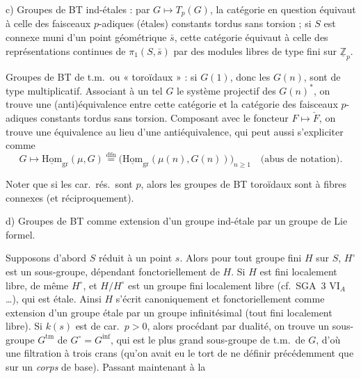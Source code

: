 \documentclass[11pt,a4paper]{article}
\begin{document}
c) Groupes de BT ind-étales : par $G \mapsto T_p(G)$, \struck{\ill{}} la catégorie en question équivaut à celle des faisceaux $p$-adiques (étales) constants tordus \struck{\ill{}} sans torsion ; si $S$ est connexe muni d'un point géométrique $\bar s$, cette catégorie équivaut à celle des représentations continues de $\pi_1(S, \bar s)$ par des modules libres de type fini sur $\underline{\mathbb{Z}}_p$.

Groupes de BT de t.m.\ ou « toroïdaux » : si $G(1)$, donc les $G(n)$, sont de type multiplicatif. Associant à un tel $G$ le système projectif des $G(n)^{*}$, on trouve \struck{\ill{}} une (anti)équivalence entre cette catégorie et la catégorie des faisceaux $p$-adiques constants tordus sans torsion. Composant avec le foncteur $F \mapsto \check F$, on trouve une équivalence au lieu d'une antiéquivalence, qui peut aussi s'expliciter comme 
\[
G \longmapsto \underline{\mathrm{Hom}}_{\mathrm{gr}}(\mu, G) \overset{\mathrm{dfn}}{=} \bigl(\underline{\mathrm{Hom}}_{\mathrm{gr}}(\mu(n), G(n))\bigr)_{n \geq 1} \quad \text{(abus de notation)} .
\]

Noter que si les car.\ rés.\ sont $p$, alors les groupes de BT toroïdaux sont  à fibres connexes (et réciproquement).

d) Groupes de BT comme extension d'un groupe ind-étale par un groupe de Lie formel.

Supposons d'abord $S$  réduit à un point $s$. Alors pour tout groupe fini $H$ sur $S$, $H^{\circ}$ est un sous-groupe, dépendant fonctoriellement de $H$. Si $H$ est fini localement libre, de même $H^{\circ}$, et $H/H^{\circ}$ est un groupe fini localement libre (cf.\ SGA~3 VI$_A$ \ldots), qui est étale. Ainsi $H$ s'écrit canoniquement et fonctoriellement comme extension d'un groupe étale par un groupe infinitésimal (tout fini localement libre). Si $k(s)$ est de car.\ $p > 0$, alors procédant par dualité, on trouve un sous-groupe $G^{\mathrm{tm}}$ de $G^{\circ} = G^{\mathrm{inf}}$, qui est le plus grand sous-groupe de t.m.\ de $G$, d'où une filtration à trois crans (qu'on avait eu le tort de ne définir précédemment que sur un \emph{corps} de base). Passant maintenant à la
\end{document}
